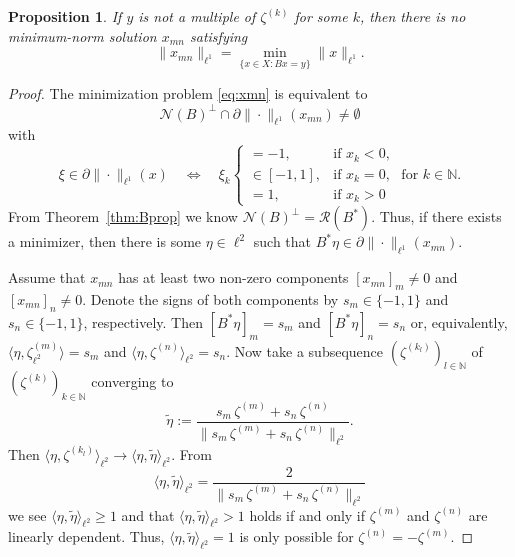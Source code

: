 \documentclass[12pt,twoside,reqno]{amsart}
\newtheorem{proposition}[theorem]{Proposition}
\theoremstyle{definition}
\numberwithin{equation}{section}
\begin{document}
\begin{proposition}
If $y$ is not a multiple of $\zeta^{(k)}$ for some $k$, then there is no minimum-norm solution $x_{mn}$ satisfying
\begin{equation}\label{eq:xmn}
\|x_{mn}\|_{\ell^1} = \min_{\{x\in X:Bx=y\}}\|x\|_{\ell^1}.
\end{equation}
\end{proposition}

\begin{proof}
The minimization problem \eqref{eq:xmn} is equivalent to
\begin{equation*}
\mathcal{N}(B)^\perp\cap\partial\|\cdot\|_{\ell^1}(x_{mn})\neq\emptyset
\end{equation*}
with
\begin{equation*}
\xi\in\partial\|\cdot\|_{\ell^1}(x)\quad\Leftrightarrow\quad\xi_k\begin{cases}
=-1,&\text{if }x_k<0,\\
\in[-1,1],&\text{if }x_k=0,\\
=1,&\text{if }x_k>0
\end{cases}
\;\text{for }k\in\mathbb{N}.
\end{equation*}
From Theorem~\ref{thm:Bprop} we know $\mathcal{N}(B)^\perp=\mathcal{R}(B^\ast)$. Thus, if there exists a minimizer, then there is some $\eta\in\ell^2$ such that $B^\ast\eta\in\partial\|\cdot\|_{\ell^1}(x_{mn})$.
\par
Assume that $x_{mn}$ has at least two non-zero components $[x_{mn}]_m\neq 0$ and $[x_{mn}]_n\neq 0$. Denote the signs of both components by $s_m\in\{-1,1\}$ and $s_n\in\{-1,1\}$, respectively. Then $[B^\ast\eta]_m=s_m$ and $[B^\ast\eta]_n=s_n$ or, equivalently, $\langle\eta,\zeta^{(m)}_{\ell^2}\rangle=s_m$ and $\langle\eta,\zeta^{(n)}\rangle_{\ell^2}=s_n$. Now take a subsequence $(\zeta^{(k_l)})_{l\in\mathbb{N}}$ of $(\zeta^{(k)})_{k\in\mathbb{N}}$ converging to
\begin{equation}
\tilde{\eta}:=\frac{s_m\,\zeta^{(m)}+s_n\,\zeta^{(n)}}{\|s_m\,\zeta^{(m)}+s_n\,\zeta^{(n)}\|_{\ell^2}}.
\end{equation}
Then $\langle\eta,\zeta^{(k_l)}\rangle_{\ell^2}\to\langle\eta,\tilde{\eta}\rangle_{\ell^2}$. From
\begin{equation}
\langle\eta,\tilde{\eta}\rangle_{\ell^2}=\frac{2}{\|s_m\,\zeta^{(m)}+s_n\,\zeta^{(n)}\|_{\ell^2}}
\end{equation}
we see $\langle\eta,\tilde{\eta}\rangle_{\ell^2}\geq 1$ and that $\langle\eta,\tilde{\eta}\rangle_{\ell^2}>1$ holds if and only if $\zeta^{(m)}$ and $\zeta^{(n)}$ are linearly dependent. Thus, $\langle\eta,\tilde{\eta}\rangle_{\ell^2}=1$ is only possible for $\zeta^{(n)}=-\zeta^{(m)}$.

\end{proof}
\end{document}
